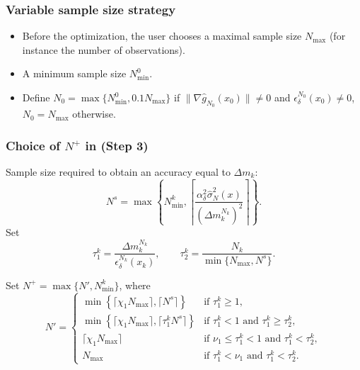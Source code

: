 \documentclass[aspectratio=169]{beamer}
\begin{document}
\begin{frame}
\frametitle{Variable sample size strategy}										

\begin{itemize}
	\item 
Before the optimization, the user chooses a maximal sample size $N_{\max}$ (for instance the number of observations).
	\item 
A minimum sample size $N^0_{\min}$. %
\item
Define $N_0 = \max\lbrace N^0_{\min}, 0.1N_{\max}\rbrace$ if $\| \nabla \hat{g}_{N_0}(x_0) \| \ne 0$ and $\epsilon_{\delta}^{N_0}(x_0) \ne 0$, $N_0 = N_{\max}$ otherwise.
\end{itemize}

\end{frame}

\begin{frame}
\frametitle{Choice of $N^+$ in (Step 3)}										

Sample size required to obtain an accuracy equal to $\Delta m_k$:
\[
N^s = \max \left\lbrace N^k_{\min},
\left\lceil
\frac{\alpha^2_{\delta}  \hat{\sigma}^2_N(x)}{(\Delta m_k^{N_k})^2}
\right\rceil \right\rbrace.
\]
Set
$$
\tau_1^k = \frac{\Delta m_k^{N_k}}{\epsilon_\delta^{N_k} (x_k)},\qquad
\tau_2^k = \frac{N_k}{\min \lbrace N_{\max}, N^s \rbrace}.
$$

Set $N^+ = \max\lbrace N', N^k_{\min}\rbrace$, where
$$
N' =
\begin{cases}
	\min \left\lbrace \lceil \chi_1 N_{\max} \rceil, \lceil N^s
	\rceil \right\rbrace & \text{if } \tau_1^k \geq 1, \\
	\min \left\lbrace \lceil \chi_1 N_{\max} \rceil, \lceil \tau_1^kN^s
	\rceil  \right\rbrace &  \text{if } \tau_1^k < 1 \text{ and }
	\tau_1^k \geq  \tau_2^k,\\
	\lceil \chi_1 N_{\max} \rceil & \text{if }  \nu_1 \leq \tau_1^k <
	1\text{ and }\tau_1^k < \tau_2^k,\\
	N_{\max} & \text{if } \tau_1^k < \nu_1\text{ and }\tau_1^k < \tau_2^k.
\end{cases}
$$


\end{frame}
\end{document}
